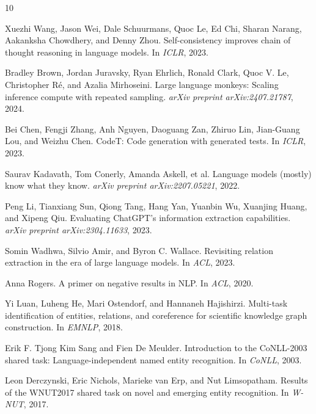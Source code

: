 \documentclass[11pt,a4paper]{article}
\begin{document}
\begin{thebibliography}{10}

Xuezhi Wang, Jason Wei, Dale Schuurmans, Quoc Le, Ed Chi, Sharan Narang, Aakanksha Chowdhery, and Denny Zhou.
Self-consistency improves chain of thought reasoning in language models.
In \emph{ICLR}, 2023.

Bradley Brown, Jordan Juravsky, Ryan Ehrlich, Ronald Clark, Quoc V. Le, Christopher R\'{e}, and Azalia Mirhoseini.
Large language monkeys: Scaling inference compute with repeated sampling.
\emph{arXiv preprint arXiv:2407.21787}, 2024.

Bei Chen, Fengji Zhang, Anh Nguyen, Daoguang Zan, Zhiruo Lin, Jian-Guang Lou, and Weizhu Chen.
CodeT: Code generation with generated tests.
In \emph{ICLR}, 2023.

Saurav Kadavath, Tom Conerly, Amanda Askell, et al.
Language models (mostly) know what they know.
\emph{arXiv preprint arXiv:2207.05221}, 2022.

Peng Li, Tianxiang Sun, Qiong Tang, Hang Yan, Yuanbin Wu, Xuanjing Huang, and Xipeng Qiu.
Evaluating ChatGPT's information extraction capabilities.
\emph{arXiv preprint arXiv:2304.11633}, 2023.

Somin Wadhwa, Silvio Amir, and Byron C. Wallace.
Revisiting relation extraction in the era of large language models.
In \emph{ACL}, 2023.

Anna Rogers.
A primer on negative results in NLP.
In \emph{ACL}, 2020.

Yi Luan, Luheng He, Mari Ostendorf, and Hannaneh Hajishirzi.
Multi-task identification of entities, relations, and coreference for scientific knowledge graph construction.
In \emph{EMNLP}, 2018.

Erik F. Tjong Kim Sang and Fien De Meulder.
Introduction to the {CoNLL}-2003 shared task: Language-independent named entity recognition.
In \emph{CoNLL}, 2003.

Leon Derczynski, Eric Nichols, Marieke van Erp, and Nut Limsopatham.
Results of the {WNUT}2017 shared task on novel and emerging entity recognition.
In \emph{W-NUT}, 2017.

\end{thebibliography}
\end{document}
